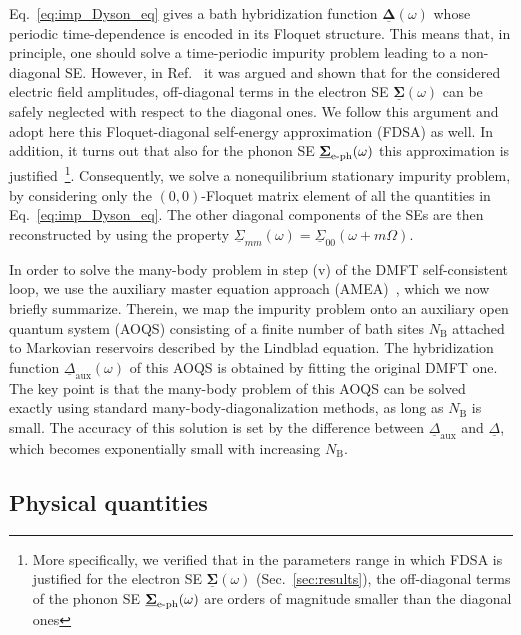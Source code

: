 \documentclass[aps,prb,groupedaddress,showpacs,twocolumn,superscriptaddress,10pt]{revtex4-2}
\newcommand{\mat}[1]{\bm{#1}} %
\newcommand{\kel}[1]{\underline{#1}} %
\begin{document}
Eq.~\eqref{eq:imp_Dyson_eq} gives a bath hybridization function $\kel{\mat\Delta}(\omega)$ whose periodic time-dependence is encoded in its Floquet structure. 
This means that, in principle, one should solve a time-periodic impurity problem leading to a non-diagonal SE. However, in Ref.~\cite{so.do.18} it was argued and shown that for the considered electric field amplitudes, off-diagonal terms in the electron SE $\kel{\mat{\Sigma}}(\omega)$ can be safely neglected with respect to the diagonal ones. We follow this argument and adopt here 
this Floquet-diagonal self-energy approximation (FDSA) as well. In addition, it turns out that also for the 
 phonon SE $\underline{\bf{\Sigma}}_{\text{e-ph}}(\omega)$ this approximation is justified~\footnote{More specifically, we verified that in the parameters range in which FDSA is justified for the electron SE $\kel{\mat{\Sigma}}(\omega)$ (Sec.~\ref{sec:results}), the off-diagonal terms of the phonon SE $\underline{\bf{\Sigma}}_{\text{e-ph}}(\omega)$ are orders of magnitude smaller than the diagonal ones}. 
Consequently, we  solve a nonequilibrium stationary impurity problem, by considering only the $(0,0)$-Floquet matrix element of all the quantities in Eq.~\eqref{eq:imp_Dyson_eq}. The other diagonal components of the SEs are then reconstructed by using the property $\kel{\Sigma}_{mm}(\omega) = \kel{\Sigma}_{00}(\omega+m\Omega)$. 


In order to solve the many-body problem in step (v) of the DMFT self-consistent loop, we use the auxiliary master equation approach (AMEA)~\cite{ar.kn.13,do.nu.14,do.ga.15,do.so.17}, which we now briefly summarize. Therein, we map the impurity problem onto an auxiliary open quantum system (AOQS) consisting of a finite number of bath sites $N_{\text{B}}$ attached to Markovian reservoirs described by the Lindblad equation. The  hybridization function $\kel{\Delta}_{\text{aux}}(\omega)$ of this AOQS is obtained by fitting the original DMFT one. The key point is that the many-body problem of this AOQS can be solved exactly using standard many-body-diagonalization methods, as long as  $N_{\text{B}}$ is small. The accuracy of this solution is set by the difference between $\kel{\Delta}_{\text{aux}}$ and $\kel{\Delta}$, which  becomes exponentially  small with increasing $N_{\text{B}}$.

	 
\subsection{Physical quantities}
\label{sec:observables}  
\end{document}
